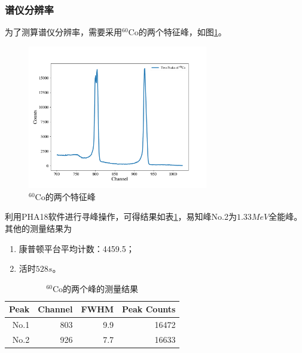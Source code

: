 \documentclass{article}
\begin{document}
\subsubsection{谱仪分辨率}
为了测算谱仪分辨率，需要采用$^{60}\text{Co}$的两个特征峰，如图\ref{fig:60Co2Peak}。
\begin{figure}
    \centering
    \includegraphics[width=0.7\textwidth]{../plots/Co_two_Peak.pdf}
    \caption{$^{60}\text{Co}$的两个特征峰\label{fig:60Co2Peak}}
\end{figure}
利用PHA18软件进行寻峰操作，可得结果如表\ref{tab:60Co}，易知峰No.2为$1.33\si{MeV}$全能峰。其他的测量结果为
\begin{enumerate}
    \item 康普顿平台平均计数：4459.5；
    \item 活时$\si{528 s}$。
\end{enumerate}
\begin{table}[htbp]
    \centering
    \caption{$^{60}\text{Co}$的两个峰的测量结果\label{tab:60Co}}
    \begin{tabular}{rrrr}
\toprule
 Peak &  Channel &  FWHM &  Peak Counts \\
\midrule
     No.1 &      803 &   9.9 &        16472 \\
     No.2 &      926 &   7.7 &        16633 \\
\bottomrule
\end{tabular}
\end{table}
\end{document}
